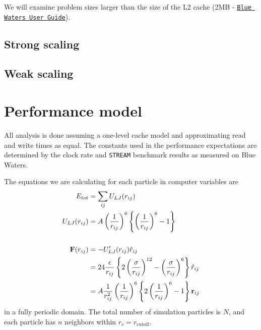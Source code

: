 \documentclass[12pt]{article}
\begin{document}
We will examine problem sizes larger than the size of the L2 cache (2MB - 
\href{https://bluewaters.ncsa.illinois.edu/user-guide}{\texttt{Blue Waters User Guide}}).

\subsection{Strong scaling}

\subsection{Weak scaling}



\section{Performance model}
All analysis is done assuming a one-level cache model and
approximating read and write times as equal.  The constants used in
the performance expectations are determined by the clock rate and
\texttt{STREAM} benchmark results as measured on Blue Waters.

The equations we are calculating for each particle in computer variables are
\begin{align}
  E_{tot} &= \sum_{ij} U_{LJ}(r_{ij}) \\
  U_{LJ}(r_{ij}) &= 
  A\left(\frac{1}{r_{ij}}\right)^{6}\left\{ \left(\frac{1}{r_{ij}}\right)^{6} - 1 \right\} \\
  \notag\\
  \textbf{F}(r_{ij}) &= - U'_{LJ}(r_{ij})\hat{r}_{ij} \notag\\
      &=  24 \frac{\epsilon}{r_{ij}} \left\{ 2 \left(\frac{\sigma}{r_{ij}}\right)^{12}
              - \left(\frac{\sigma}{r_{ij}}\right)^6 \right\} \hat{r}_{ij} \notag\\
              &=  A \frac{1}{r_{ij}^2} \left(\frac{1}{r_{ij}}\right)^{6} \left\{ 2 \left(\frac{1}{r_{ij}}\right)^{6}
              - 1 \right\} \textbf{r}_{ij}
\end{align}
in a fully periodic domain. The total number of simulation particles
is $N$, and each particle has $n$ neighbors within
$r_c=r_{\text{cutoff}}$.
\end{document}
